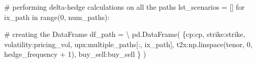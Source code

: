 \documentclass[
  letterpaper,
  DIV=11,
  numbers=noendperiod]{scrreprt}
\newenvironment{Shaded}{\begin{snugshade}}{\end{snugshade}}
\newcommand{\BuiltInTok}[1]{\textcolor[rgb]{0.00,0.23,0.31}{#1}}
\newcommand{\CommentTok}[1]{\textcolor[rgb]{0.37,0.37,0.37}{#1}}
\newcommand{\ControlFlowTok}[1]{\textcolor[rgb]{0.00,0.23,0.31}{#1}}
\newcommand{\DecValTok}[1]{\textcolor[rgb]{0.68,0.00,0.00}{#1}}
\newcommand{\KeywordTok}[1]{\textcolor[rgb]{0.00,0.23,0.31}{#1}}
\newcommand{\NormalTok}[1]{\textcolor[rgb]{0.00,0.23,0.31}{#1}}
\newcommand{\OperatorTok}[1]{\textcolor[rgb]{0.37,0.37,0.37}{#1}}
\newcommand{\StringTok}[1]{\textcolor[rgb]{0.13,0.47,0.30}{#1}}
\begin{document}
\begin{Shaded}
\begin{Highlighting}[]
\CommentTok{\# performing delta{-}hedge calculations on all the paths}
\NormalTok{lst\_scenarios }\OperatorTok{=}\NormalTok{ []}
\ControlFlowTok{for}\NormalTok{ ix\_path }\KeywordTok{in} \BuiltInTok{range}\NormalTok{(}\DecValTok{0}\NormalTok{, num\_paths):}
    
    \CommentTok{\# creating the DataFrame}
\NormalTok{    df\_path }\OperatorTok{=} \OperatorTok{\textbackslash{}}
\NormalTok{        pd.DataFrame(}
\NormalTok{            \{}\StringTok{\textquotesingle{}cp\textquotesingle{}}\NormalTok{:cp,}
             \StringTok{\textquotesingle{}strike\textquotesingle{}}\NormalTok{:strike,}
             \StringTok{\textquotesingle{}volatility\textquotesingle{}}\NormalTok{:pricing\_vol,}
             \StringTok{\textquotesingle{}upx\textquotesingle{}}\NormalTok{:multiple\_paths[:, ix\_path], }
             \StringTok{\textquotesingle{}t2x\textquotesingle{}}\NormalTok{:np.linspace(tenor, }\DecValTok{0}\NormalTok{, hedge\_frequency }\OperatorTok{+} \DecValTok{1}\NormalTok{),}
             \StringTok{\textquotesingle{}buy\_sell\textquotesingle{}}\NormalTok{:buy\_sell}
\NormalTok{            \}}
\NormalTok{        )}
    

\end{Highlighting}
\end{Shaded}
\end{document}
